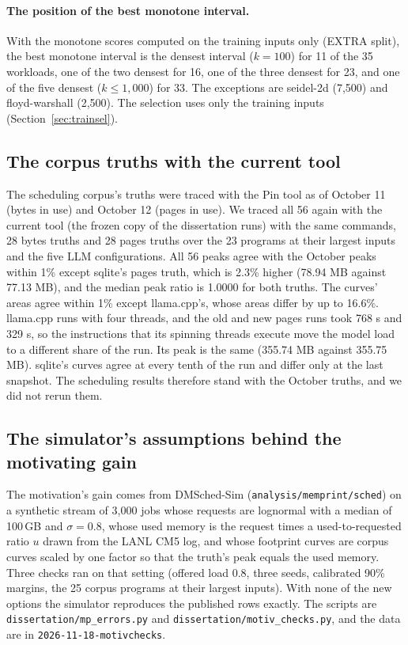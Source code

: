 \documentclass[11pt]{article}
\begin{document}
\paragraph{The position of the best monotone interval.} With the monotone scores computed on the training inputs only
(EXTRA split), the best monotone interval is the densest interval ($k = 100$) for 11 of the 35 workloads, one of the
two densest for 16, one of the three densest for 23, and one of the five densest ($k \le 1{,}000$) for 33. The
exceptions are seidel-2d (7{,}500) and floyd-warshall (2{,}500). The selection uses only the training inputs
(Section~\ref{sec:trainsel}).

\subsection{The corpus truths with the current tool}
\label{sec:truthcur}

The scheduling corpus's truths were traced with the Pin tool as of October 11 (bytes in use) and October 12 (pages
in use). We traced all 56 again with the current tool (the frozen copy of the dissertation runs) with the same
commands, 28 bytes truths and 28 pages truths over the 23 programs at their largest inputs and the five LLM
configurations. All 56 peaks agree with the October peaks within 1\% except sqlite's pages truth, which is 2.3\%
higher (78.94 MB against 77.13 MB), and the median peak ratio is 1.0000 for both truths. The curves' areas agree within
1\% except llama.cpp's, whose areas differ by up to 16.6\%. llama.cpp runs with four threads, and the old and new pages
runs took 768 s and 329 s, so the instructions that its spinning threads execute move the model load to a different
share of the run. Its peak is the same (355.74 MB against 355.75 MB). sqlite's curves agree at every tenth of the run
and differ only at the last snapshot. The scheduling results therefore stand with the October truths, and we did not
rerun them.

\subsection{The simulator's assumptions behind the motivating gain}
\label{sec:motivchecks}

The motivation's gain comes from DMSched-Sim (\texttt{analysis/memprint/sched}) on a synthetic stream of 3{,}000 jobs
whose requests are lognormal with a median of 100\,GB and $\sigma = 0.8$, whose used memory is the request times a
used-to-requested ratio $u$ drawn from the LANL CM5 log, and whose footprint curves are corpus curves scaled by one
factor so that the truth's peak equals the used memory. Three checks ran on that setting (offered load 0.8, three
seeds, calibrated 90\% margins, the 25 corpus programs at their largest inputs). With none of the new options the
simulator reproduces the published rows exactly. The scripts are \texttt{dissertation/mp\_errors.py} and
\texttt{dissertation/motiv\_checks.py}, and the data are in \texttt{2026-11-18-motivchecks}.
\end{document}

